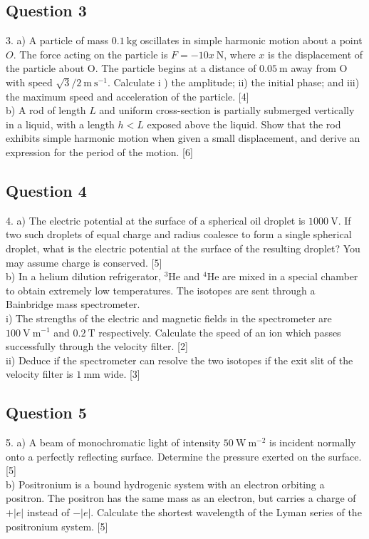 \documentclass{article}
\begin{document}
\subsection{Question 3}
3. a) A particle of mass $0.1 \mathrm{~kg}$ oscillates in simple harmonic motion about a point $O$. The force acting on the particle is $F=-10 x \mathrm{~N}$, where $x$ is the displacement of the particle about $\mathrm{O}$. The particle begins at a distance of $0.05 \mathrm{~m}$ away from $\mathrm{O}$ with speed $\sqrt{3} / 2 \mathrm{~m} \mathrm{~s}^{-1}$. Calculate $\mathrm{i}$ ) the amplitude; ii) the initial phase; and iii) the maximum speed and acceleration of the particle. [4] \\
b) A rod of length $L$ and uniform cross-section is partially submerged vertically in a liquid, with a length $h<L$ exposed above the liquid. Show that the rod exhibits simple harmonic motion when given a small displacement, and derive an expression for the period of the motion. [6]

\subsection{Question 4}
4. a) The electric potential at the surface of a spherical oil droplet is $1000 \mathrm{~V}$. If two such droplets of equal charge and radius coalesce to form a single spherical droplet, what is the electric potential at the surface of the resulting droplet? You may assume charge is conserved. [5] \\
b) In a helium dilution refrigerator, ${ }^{3} \mathrm{He}$ and ${ }^{4} \mathrm{He}$ are mixed in a special chamber to obtain extremely low temperatures. The isotopes are sent through a Bainbridge mass spectrometer. \\
i) The strengths of the electric and magnetic fields in the spectrometer are $100 \mathrm{~V} \mathrm{~m}^{-1}$ and $0.2 \mathrm{~T}$ respectively. Calculate the speed of an ion which passes successfully through the velocity filter. [2] \\
ii) Deduce if the spectrometer can resolve the two isotopes if the exit slit of the velocity filter is $1 \mathrm{~mm}$ wide. [3]

\subsection{Question 5}
5. a) A beam of monochromatic light of intensity $50 \mathrm{~W} \mathrm{~m}^{-2}$ is incident normally onto a perfectly reflecting surface. Determine the pressure exerted on the surface. [5] \\
b) Positronium is a bound hydrogenic system with an electron orbiting a positron. The positron has the same mass as an electron, but carries a charge of $+|e|$ instead of $-|e| .$ Calculate the shortest wavelength of the Lyman series of the positronium system. [5]
\end{document}
